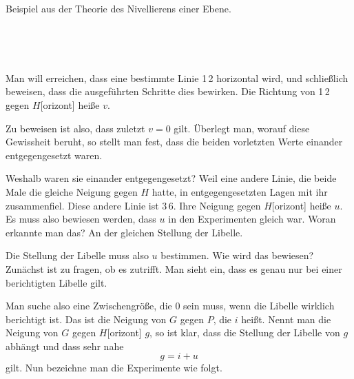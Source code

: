 \begin{center}Beispiel aus der Theorie des Nivellierens einer Ebene.\end{center}


\begin{center}
\begin{minipage}[t]{.52\linewidth}\centering{}\\[8pt]\end{minipage}\hfill
\begin{minipage}[t]{.39\linewidth}\centering\textls{[Libelle]}\\[8pt]\end{minipage}
\end{center}



Man will erreichen, dass eine bestimmte Linie 1\,2 horizontal wird, und schließlich beweisen, dass die ausgeführten Schritte dies bewirken. Die Richtung von 1\,2 gegen $H$[orizont] heiße $v$.

Zu beweisen ist also, dass zuletzt $v=0$ gilt. Überlegt man, worauf diese Gewissheit beruht, so stellt man fest, dass die beiden vorletzten Werte einander entgegengesetzt waren.

Weshalb waren sie einander entgegengesetzt? Weil eine andere Linie, die beide Male die gleiche Neigung gegen $H$ hatte, in entgegengesetzten Lagen mit ihr zusammenfiel. Diese andere Linie ist 3\,6. Ihre Neigung gegen $H$[orizont] heiße $u$. Es muss also bewiesen werden, dass $u$ in den Experimenten gleich war. Woran erkannte man das? An der gleichen Stellung der Libelle.

Die Stellung der Libelle muss also $u$ bestimmen. Wie wird das bewiesen? Zunächst ist zu fragen, ob es zutrifft. Man sieht ein, dass es genau nur bei einer berichtigten Libelle gilt.

Man suche also eine Zwischengröße, die 0 sein muss, wenn die Libelle wirklich berichtigt ist. Das ist die Neigung von $G$ gegen $P$, die $i$ heißt. Nennt man die Neigung von $G$ gegen $H$[orizont] $g$, so ist klar, dass die Stellung der Libelle von $g$ abhängt und dass sehr nahe
\[
g = i + u
\]
gilt. Nun bezeichne man die Experimente wie folgt.
